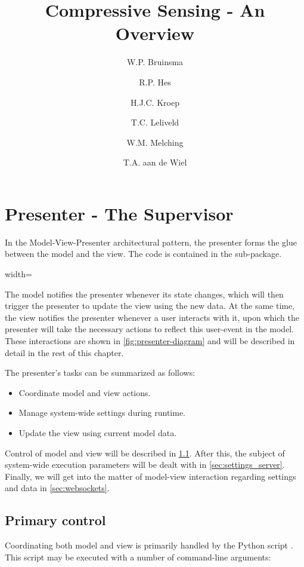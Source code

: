 \documentclass[a4paper, openany, oneside]{memoir}
\title{Compressive Sensing - An Overview}
\author{W.P. Bruinsma \and R.P. Hes \and H.J.C. Kroep \and T.C. Leliveld \and W.M. Melching \and T.A. aan de Wiel}
\begin{document}
\chapter{Presenter - The Supervisor}
\label{cha:presenter}
In the Model-View-Presenter architectural pattern, the presenter forms the glue between the model and the view. The code is contained in the  sub-package.
\begin{figure*}[h]
    \centering
    \begin{adjustbox}{width=\textwidth}
    
    \end{adjustbox}
    \caption{The presenter and the central role it fulfills in the system}
    \label{fig:presenter-diagram}
\end{figure*}

The model notifies the presenter whenever its state changes, which will then trigger the presenter to update the view using the new data. At the same time, the view notifies the presenter whenever a user interacts with it, upon which the presenter will take the necessary actions to reflect this user-event in the model. These interactions are shown in \cref{fig:presenter-diagram} and will be described in detail in the rest of this chapter.

The presenter's tasks can be summarized as follows:
\begin{itemize}
	\item Coordinate model and view actions.
	\item Manage system-wide settings during runtime.
	\item Update the view using current model data.
\end{itemize}

Control of model and view will be described in \cref{sec:control}. After this, the subject of system-wide execution parameters will be dealt with in \cref{sec:settings_server}. Finally, we will get into the matter of model-view interaction regarding settings and data in \cref{sec:websockets}.

\section{Primary control}
\label{sec:control}
Coordinating both model and view is primarily handled by the Python script . This script may be executed with a number of command-line arguments:
\end{document}
